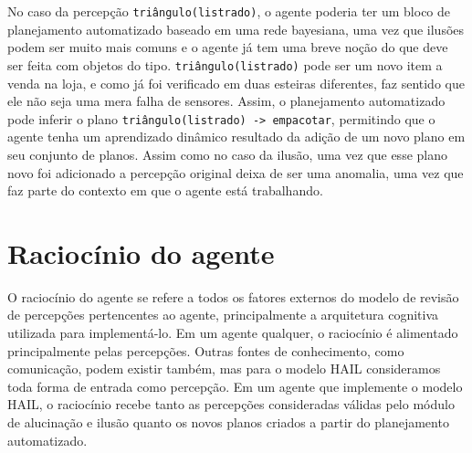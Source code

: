 \begin{example}
    No caso da percepção \texttt{triângulo(listrado)}, o agente poderia ter um bloco de planejamento automatizado baseado em uma rede bayesiana, uma vez que ilusões podem ser muito mais comuns e o agente já tem uma breve noção do que deve ser feita com objetos do tipo. \texttt{triângulo(listrado)} pode ser um novo item a venda na loja, e como já foi verificado em duas esteiras diferentes, faz sentido que ele não seja uma mera falha de sensores. Assim, o planejamento automatizado pode inferir o plano \texttt{triângulo(listrado) -> empacotar}, permitindo que o agente tenha um aprendizado dinâmico resultado da adição de um novo plano em seu conjunto de planos. Assim como no caso da ilusão, uma vez que esse plano novo foi adicionado a percepção original deixa de ser uma anomalia, uma vez que faz parte do contexto em que o agente está trabalhando.
    \label{example::planejamento}
\end{example}{}

\section{Raciocínio do agente}

O raciocínio do agente se refere a todos os fatores externos do modelo de revisão de percepções pertencentes ao agente, principalmente a arquitetura cognitiva utilizada para implementá-lo. Em um agente qualquer, o raciocínio é alimentado principalmente pelas percepções. Outras fontes de conhecimento, como comunicação, podem existir também, mas para o modelo HAIL consideramos toda forma de entrada como percepção. Em um agente que implemente o modelo HAIL, o raciocínio recebe tanto as percepções consideradas válidas pelo módulo de alucinação e ilusão quanto os novos planos criados a partir do planejamento automatizado.